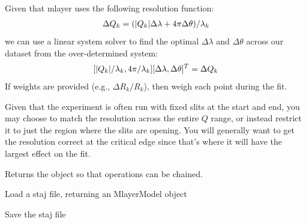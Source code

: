 \documentclass[letterpaper,10pt,english]{sphinxmanual}
\begin{document}
\begin{fulllineitems}
\begin{fulllineitems}
Given that mlayer uses the following resolution function:
\begin{gather}
\begin{split}\Delta Q_k = (|Q_k| \Delta\lambda + 4 \pi \Delta\theta)/\lambda_k\end{split}\notag
\end{gather}
we can use a linear system solver to find the optimal
$\Delta \lambda$ and $\Delta \theta$ across our dataset from the
over-determined system:
\begin{gather}
\begin{split}[|Q_k|/\lambda_k, 4\pi/\lambda_k][\Delta\lambda, \Delta\theta]^T
    = \Delta Q_k\end{split}\notag
\end{gather}
If weights are provided (e.g., $\Delta R_k/R_k$), then weigh each
point during the fit.

Given that the experiment is often run with fixed slits at the
start and end, you may choose to match the resolution across the
entire $Q$ range, or instead restrict it to just the region where
the slits are opening.  You will generally want to get the resolution
correct at the critical edge since that's where it will have the
largest effect on the fit.

Returns the object so that operations can be chained.

\end{fulllineitems}


\begin{fulllineitems}
\label{api/staj:refl1d.staj.MlayerModel.load}
Load a staj file, returning an MlayerModel object

\end{fulllineitems}


\begin{fulllineitems}
\label{api/staj:refl1d.staj.MlayerModel.mu}
\end{fulllineitems}


\begin{fulllineitems}
\label{api/staj:refl1d.staj.MlayerModel.save}
Save the staj file


\end{fulllineitems}
\end{fulllineitems}
\end{document}
